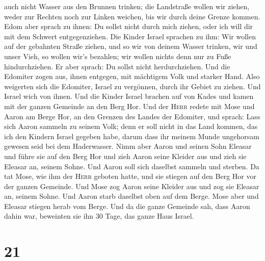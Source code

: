 auch nicht Wasser aus den Brunnen trinken; die Landstraße wollen wir
ziehen, weder zur Rechten noch zur Linken weichen, bis wir durch deine
Grenze kommen.  Edom aber sprach zu ihnen: Du sollst
nicht durch mich ziehen, oder ich will dir mit dem Schwert
entgegenziehen.  Die Kinder Israel sprachen zu ihm: Wir
wollen auf der gebahnten Straße ziehen, und so wir von deinem Wasser
trinken, wir und unser Vieh, so wollen wir's bezahlen; wir wollen nichts
denn nur zu Fuße hindurchziehen.  Er aber sprach: Du
sollst nicht herdurchziehen. Und die Edomiter zogen aus, ihnen entgegen,
mit mächtigem Volk und starker Hand.  Also weigerten sich
die Edomiter, Israel zu vergönnen, durch ihr Gebiet zu ziehen. Und
Israel wich von ihnen.  Und die Kinder Israel brachen auf
von Kades und kamen mit der ganzen Gemeinde an den Berg Hor.
 Und der \textsc{Herr} redete mit Mose und Aaron am Berge
Hor, an den Grenzen des Landes der Edomiter, und sprach: 
Lass sich Aaron sammeln zu seinem Volk; denn er soll nicht in das Land
kommen, das ich den Kindern Israel gegeben habe, darum dass ihr meinem
Munde ungehorsam gewesen seid bei dem Haderwasser.  Nimm
aber Aaron und seinen Sohn Eleasar und führe sie auf den Berg Hor
 und zieh Aaron seine Kleider aus und zieh sie Eleasar
an, seinem Sohne. Und Aaron soll sich daselbst sammeln und sterben.
 Da tat Mose, wie ihm der \textsc{Herr} geboten hatte,
und sie stiegen auf den Berg Hor vor der ganzen Gemeinde.
 Und Mose zog Aaron seine Kleider aus und zog sie Eleasar
an, seinem Sohne. Und Aaron starb daselbst oben auf dem Berge. Mose aber
und Eleasar stiegen herab vom Berge.  Und da die ganze
Gemeinde sah, dass Aaron dahin war, beweinten sie ihn 30 Tage, das ganze
Haus Israel.

\hypertarget{section-20}{%
\section{21}\label{section-20}}

